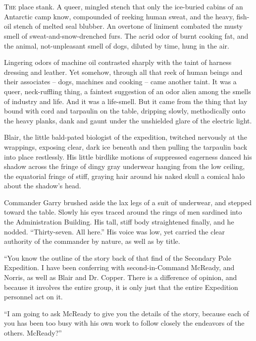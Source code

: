\documentclass[ebook,oneside,11pt]{memoir}				%
\begin{document}
\mainmatter
\pagestyle{fancy}
\chapter[Chapter 1]{}
\lettrine[lines=3,findent=3pt,nindent=2pt]{T}{he} place stank. A queer, mingled stench that only the ice-buried cabins of an Antarctic camp know, compounded of reeking human sweat, and the heavy, fish-oil stench of melted seal blubber. An overtone of liniment combated the musty smell of sweat-and-snow-drenched furs. The acrid odor of burnt cooking fat, and the animal, not-unpleasant smell of dogs, diluted by time, hung in the air.

Lingering odors of machine oil contrasted sharply with the taint of harness dressing and leather. Yet somehow, through all that reek of human beings and their associates -- dogs, machines and cooking -- came another taint. It was a queer, neck-ruffling thing, a faintest suggestion of an odor alien among the smells of industry and life. And it was a life-smell. But it came from the thing that lay bound with cord and tarpaulin on the table, dripping slowly, methodically onto the heavy planks, dank and gaunt under the unshielded glare of the electric light.

Blair, the little bald-pated biologist of the expedition, twitched nervously at the wrappings, exposing clear, dark ice beneath and then pulling the tarpaulin back into place restlessly. His little birdlike motions of suppressed eagerness danced his shadow across the fringe of dingy gray underwear hanging from the low ceiling, the equatorial fringe of stiff, graying hair around his naked skull a comical halo about the shadow's head.

Commander Garry brushed aside the lax legs of a suit of underwear, and stepped toward the table. Slowly his eyes traced around the rings of men sardined into the Administration Building. His tall, stiff body straightened finally, and he nodded. ``Thirty-seven. All here.'' His voice was low, yet carried the clear authority of the commander by nature, as well as by title.

``You know the outline of the story back of that find of the Secondary Pole Expedition. I have been conferring with second-in-Command McReady, and Norris, as well as Blair and Dr. Copper. There is a difference of opinion, and because it involves the entire group, it is only just that the entire Expedition personnel act on it.

``I am going to ask McReady to give you the details of the story, because each of you has been too busy with his own work to follow closely the endeavors of the others. McReady?''
\end{document}
